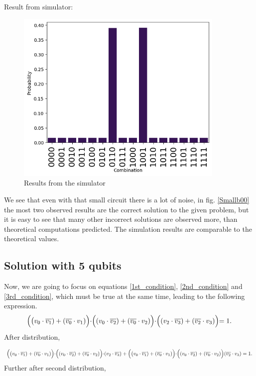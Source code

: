 Result from simulator:
\begin{figure}[H]
\centering
\includegraphics[width=10cm]{Figures/sim0.png}
\caption{Results from the simulator}
\label{sim0}
\end{figure}


We see that even with that small circuit there is a lot of noise, in fig. \ref{Smallb00} the most two observed results are the correct solution to the given problem, but it is easy to see that many other incorrect solutions are observed more, than theoretical computations predicted. The simulation results are comparable to the theoretical values.

\subsection{Solution with 5 qubits}

Now, we are going to focus on equations \ref{1st_condition}, \ref{2nd_condition} and \ref{3rd_condition}, which must be true at the same time, leading to the following expression.
\begin{equation}
    \Bigl( \big(v_0 \cdot \overline{v_1})+(\overline{v_0} \cdot v_1) \Bigl) \cdot \Bigl( (v_0 \cdot \overline{v_2})+(\overline{v_0} \cdot v_2) \Bigl) \cdot \Bigl( (v_2 \cdot \overline{v_3})+(\overline{v_2} \cdot v_3) \Bigl) = 1.
\end{equation}
After distribution,

\begin{equation}
    \Bigl( \big(v_0 \cdot \overline{v_1})+(\overline{v_0} \cdot v_1) \Bigl) \cdot \Bigl( (v_0 \cdot \overline{v_2})+(\overline{v_0} \cdot v_2) \Bigl) \cdot  (v_2 \cdot \overline{v_3})+\Bigl( \big(v_0 \cdot \overline{v_1})+(\overline{v_0} \cdot v_1) \Bigl) \cdot \Bigl( (v_0 \cdot \overline{v_2})+(\overline{v_0} \cdot v_2) \Bigl)(\overline{v_2} \cdot v_3)  = 1.
\end{equation}
Further after second distribution,

